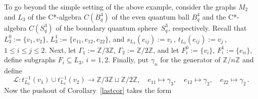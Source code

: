 \documentclass[12pt,times,a4paper]{amsart}
\numberwithin{equation}{section}
\numberwithin{equation}{section}
\begin{document}
To go beyond the simple setting of the above example, 
consider the graphs $M_2$ and $L_3$ of the  C*-algebra $C(B^4_q)$ of the even quantum ball $B^4_q$ and 
the C*-algebra $C(S^3_q)$ of the boundary quantum sphere~$S^3_q$,
 respectively. Recall that
$L_3^0:=\{v_1,v_2\}$, $L^1_3:=\{e_{11},e_{12},e_{22}\}$, and $s_{L_3}(e_{ij}):=v_i\,$, $t_{L_3}(e_{ij}):=v_j\,$, $1\leq i\leq j\leq 2$.
Next, let $\Gamma_1:=\mathbb{Z}/3\mathbb{Z}$, $\Gamma_2:=\mathbb{Z}/2\mathbb{Z}$, and 
let $F^0_i:=\{v_i\}$, $F^1_i:=\{e_{ii}\}$, define  subgraphs $F_i\subseteq L_3$, $i=1,2$. 
Finally, put $\gamma_n$ for the generator of $\mathbb{Z}/n\mathbb{Z}$ and define
\begin{equation}
\mathcal{L}:t_{L_3}^{-1}(v_1)\cup t_{L_3}^{-1}(v_2)\longrightarrow\mathbb{Z}/3\mathbb{Z}\sqcup\mathbb{Z}/2\mathbb{Z},\quad 
e_{11}\longmapsto \gamma_3,
\quad e_{12}\longmapsto \gamma_2,\quad e_{22}\longmapsto \gamma_2\,.
\end{equation}
Now the pushout of Corollary~\ref{lastcor} takes the form
\end{document}

